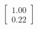\documentclass[preview]{standalone}
\begin{document}
\begin{align*}
\begin{bmatrix} 1.00 \\ 0.22 \end{bmatrix}
\end{align*}
\end{document}
